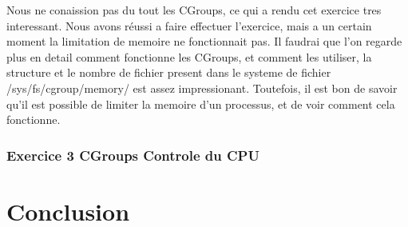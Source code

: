 \documentclass[
	a4paper, %
	10pt, %
]{CSUniSchoolLabReport}
\begin{document}

Nous ne conaission pas du tout les CGroups, ce qui a rendu cet exercice tres interessant.
Nous avons réussi a faire effectuer l'exercice, mais a un certain moment la limitation de memoire ne fonctionnait pas.
Il faudrai que l'on regarde plus en detail comment fonctionne les CGroups, et comment les utiliser, la structure et le nombre de fichier present dans le systeme de fichier /sys/fs/cgroup/memory/ est assez impressionant.
Toutefois, il est bon de savoir qu'il est possible de limiter la memoire d'un processus, et de voir comment cela fonctionne.

\subsubsection{Exercice 3 CGroups Controle du CPU}\label{MPEx3}

\section{Conclusion}


\printbibliography %

\end{document}
